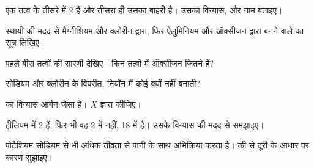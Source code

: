 \begin{exercise}[$\star\star$]\label{exo:g10:electron-shells:7}
एक तत्व के तीसरे  में 2  हैं और तीसरा  ही उसका बाहरी
 है। उसका विन्यास,  और नाम बताइए।
\end{exercise}

\begin{exercise}[$\star\star$]\label{exo:g10:electron-shells:8}
स्थायी  की मदद से मैग्नीशियम और क्लोरीन द्वारा, फिर ऐलुमिनियम और ऑक्सीजन
द्वारा बनने वाले  का सूत्र लिखिए।
\end{exercise}

\begin{exercise}[$\star\star$]\label{exo:g10:electron-shells:9}
पहले बीस तत्वों की सारणी देखिए। किन तत्वों में ऑक्सीजन जितने
 हैं?
\end{exercise}

\begin{exercise}[$\star\star$]\label{exo:g10:electron-shells:10}
सोडियम और क्लोरीन के विपरीत, नियॉन  में कोई  क्यों
नहीं बनाती?
\end{exercise}

\begin{exercise}[$\star\star$]\label{exo:g10:electron-shells:11}
  का विन्यास आर्गन जैसा है। $X$ ज्ञात कीजिए।
\end{exercise}

\begin{exercise}[$\star\star\star$]\label{exo:g10:electron-shells:12}
हीलियम में 2  हैं, फिर भी वह  2 में नहीं,  18 में है।
उसके विन्यास की मदद से समझाइए।
\end{exercise}

\begin{exercise}[$\star\star\star$]\label{exo:g10:electron-shells:13}
पोटैशियम सोडियम से भी अधिक तीव्रता से पानी के साथ अभिक्रिया करता है।  की  से दूरी के आधार पर कारण सुझाइए।
\end{exercise}

